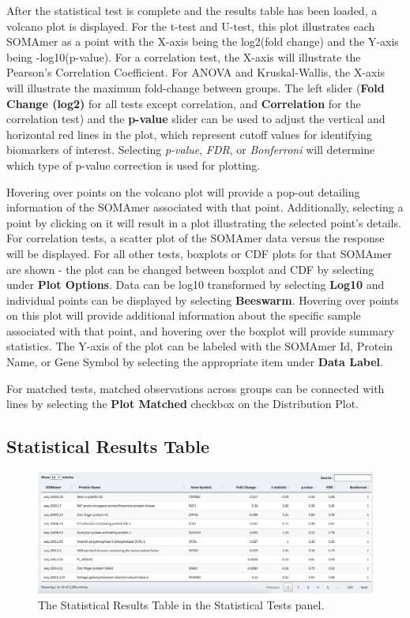 \documentclass[
]{book}
\begin{document}
After the statistical test is complete and the results table has been loaded, a volcano plot is displayed. For the t-test and U-test, this plot illustrates each SOMAmer as a point with the X-axis being the log2(fold change) and the Y-axis being -log10(p-value). For a correlation test, the X-axis will illustrate the Pearson's Correlation Coefficient. For ANOVA and Kruskal-Wallis, the X-axis will illustrate the maximum fold-change between groups. The left slider (\textbf{Fold Change (log2)} for all tests except correlation, and \textbf{Correlation} for the correlation test) and the \textbf{p-value} slider can be used to adjust the vertical and horizontal red lines in the plot, which represent cutoff values for identifying biomarkers of interest. Selecting \emph{p-value}, \emph{FDR}, or \emph{Bonferroni} will determine which type of p-value correction is used for plotting.

Hovering over points on the volcano plot will provide a pop-out detailing information of the SOMAmer associated with that point. Additionally, selecting a point by clicking on it will result in a plot illustrating the selected point's details. For correlation tests, a scatter plot of the SOMAmer data versus the response will be displayed. For all other tests, boxplots or CDF plots for that SOMAmer are shown - the plot can be changed between boxplot and CDF by selecting under \textbf{Plot Options}. Data can be log10 transformed by selecting \textbf{Log10} and individual points can be displayed by selecting \textbf{Beeswarm}. Hovering over points on this plot will provide additional information about the specific sample associated with that point, and hovering over the boxplot will provide summary statistics. The Y-axis of the plot can be labeled with the SOMAmer Id, Protein Name, or Gene Symbol by selecting the appropriate item under \textbf{Data Label}.

For matched tests, matched observations across groups can be connected with lines by selecting the \textbf{Plot Matched} checkbox on the Distribution Plot.

\hypertarget{statistical-results-table}{%
\subsection{Statistical Results Table}\label{statistical-results-table}}

\begin{figure}
\centering
\includegraphics{images/StatTest_ResultsTable.png}
\caption{The Statistical Results Table in the Statistical Tests panel.}
\end{figure}
\end{document}
